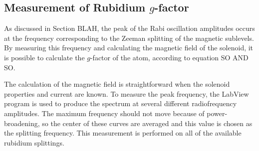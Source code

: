\subsection{Measurement of Rubidium $g$-factor}

As discussed in Section BLAH, the peak of the Rabi oscillation amplitudes occurs at the frequency corresponding to the Zeeman splitting of the magnetic sublevels. By measuring this frequency and calculating the magnetic field of the solenoid, it is possible to calculate the $g$-factor of the atom, according to equation SO AND SO.

The calculation of the magnetic field is straightforward when the solenoid properties and current are known. To measure the peak frequency, the LabView program is used to produce the spectrum at several different radiofrequency amplitudes. The maximum frequency should not move because of power-broadening, so the center of these curves are averaged and this value is chosen as the splitting frequency. This measurement is performed on all of the available rubidium splittings.











